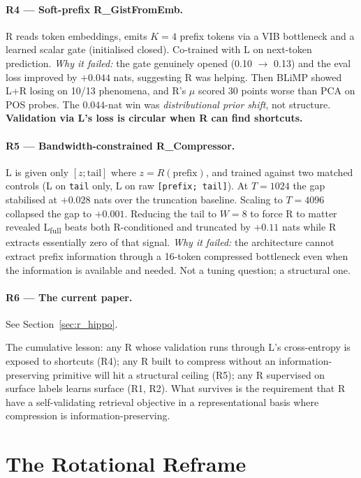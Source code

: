 \documentclass[10pt, twocolumn, a4paper]{article}
\begin{document}
\paragraph{R4 --- Soft-prefix R\_GistFromEmb.} R reads token embeddings, emits $K=4$ prefix tokens via a VIB bottleneck and a learned scalar gate (initialised closed). Co-trained with L on next-token prediction. \emph{Why it failed:} the gate genuinely opened (0.10 $\to$ 0.13) and the eval loss improved by $+0.044$ nats, suggesting R was helping. Then BLiMP showed L+R losing on 10/13 phenomena, and R's $\mu$ scored 30 points worse than PCA on POS probes. The $0.044$-nat win was \emph{distributional prior shift}, not structure. \textbf{Validation via L's loss is circular when R can find shortcuts.}

\paragraph{R5 --- Bandwidth-constrained R\_Compressor.} L is given only $[z; \text{tail}]$ where $z = R(\text{prefix})$, and trained against two matched controls (L on \texttt{tail} only, L on raw \texttt{[prefix; tail]}). At $T=1024$ the gap stabilised at $+0.028$ nats over the truncation baseline. Scaling to $T=4096$ collapsed the gap to $+0.001$. Reducing the tail to $W=8$ to force R to matter revealed L\textsubscript{full} beats both R-conditioned and truncated by $+0.11$ nats while R extracts essentially zero of that signal. \emph{Why it failed:} the architecture cannot extract prefix information through a 16-token compressed bottleneck even when the information is available and needed. Not a tuning question; a structural one.

\paragraph{R6 --- The current paper.} See Section~\ref{sec:r_hippo}.

The cumulative lesson: any R whose validation runs through L's cross-entropy is exposed to shortcuts (R4); any R built to compress without an information-preserving primitive will hit a structural ceiling (R5); any R supervised on surface labels learns surface (R1, R2). What survives is the requirement that R have a self-validating retrieval objective in a representational basis where compression is information-preserving.


\section{The Rotational Reframe}
\label{sec:rotation}
\end{document}
